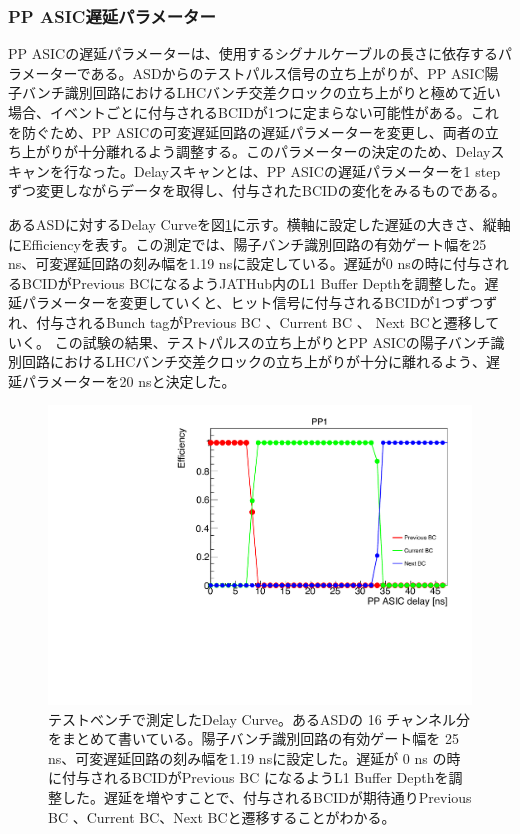 \subsubsection{PP ASIC遅延パラメーター}
\baselineskip
PP ASICの遅延パラメーターは、使用するシグナルケーブルの長さに依存するパラメーターである。ASDからのテストパルス信号の立ち上がりが、PP ASIC陽子バンチ識別回路におけるLHCバンチ交差クロックの立ち上がりと極めて近い場合、イベントごとに付与されるBCIDが1つに定まらない可能性がある。これを防ぐため、PP ASICの可変遅延回路の遅延パラメーターを変更し、両者の立ち上がりが十分離れるよう調整する。このパラメーターの決定のため、Delayスキャンを行なった。Delayスキャンとは、PP ASICの遅延パラメーターを1 stepずつ変更しながらデータを取得し、付与されたBCIDの変化をみるものである。

あるASDに対するDelay Curveを図\ref{QAQCdelayscan}に示す。横軸に設定した遅延の大きさ、縦軸にEfficiencyを表す。この測定では、陽子バンチ識別回路の有効ゲート幅を25 ns、可変遅延回路の刻み幅を1.19 nsに設定している。遅延が0 nsの時に付与されるBCIDがPrevious BCになるようJATHub内のL1 Buffer Depthを調整した。遅延パラメーターを変更していくと、ヒット信号に付与されるBCIDが1つずつずれ、付与されるBunch tagがPrevious BC 、Current BC 、 Next BCと遷移していく。
この試験の結果、テストパルスの立ち上がりとPP ASICの陽子バンチ識別回路におけるLHCバンチ交差クロックの立ち上がりが十分に離れるよう、遅延パラメーターを20 nsと決定した。
\begin{figure} 
\centering
\includegraphics[width=16cm]{fig/QAQC/QAQCdelayscan.pdf}
\caption[ディレイカーブ]{テストベンチで測定したDelay Curve。あるASDの 16 チャンネル分をまとめて書いている。陽子バンチ識別回路の有効ゲート幅を 25 ns、可変遅延回路の刻み幅を1.19 nsに設定した。遅延が 0 ns の時に付与されるBCIDがPrevious BC になるようL1 Buffer Depthを調整した。遅延を増やすことで、付与されるBCIDが期待通りPrevious BC 、Current BC、Next BCと遷移することがわかる。}
\label{QAQCdelayscan}
\end{figure}

